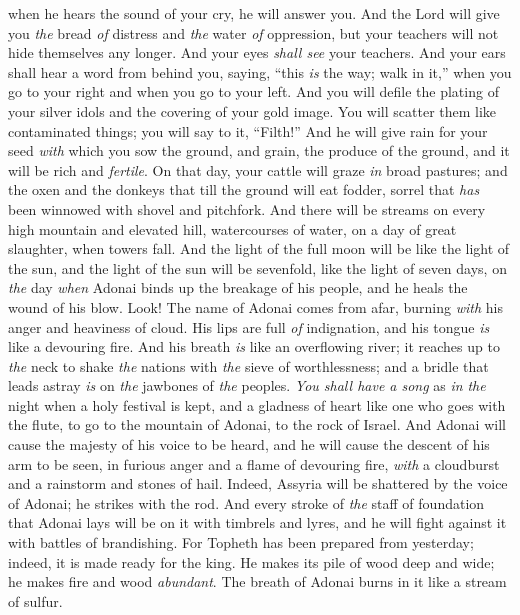 \begin{biblechapter}
when he hears the sound of your cry, he will answer you.
\verse And the Lord will give you \textit{the} bread \textit{of} distress 
and \textit{the} water \textit{of} oppression, 
but your teachers will not hide themselves any longer. 
And your eyes \textit{shall see} your teachers.
\verse And your ears shall hear a word from behind you, saying, 
“this \textit{is} the way; walk in it,” 
when you go to your right 
and when you go to your left.
\verse And you will defile the plating of your silver idols 
and the covering of your gold image. 
You will scatter them like contaminated things; 
you will say to it, “Filth!”
\verse And he will give rain for your seed \textit{with} which you sow the ground, 
and grain, the produce of the ground, and it will be rich and \textit{fertile}. 
On that day, your cattle will graze \textit{in} broad pastures;
\verse and the oxen and the donkeys that till the ground will eat fodder, sorrel 
that \textit{has} been winnowed with shovel and pitchfork.
\verse And there will be streams on every high mountain and elevated hill, 
watercourses of water, on a day of great slaughter, when towers fall.
\verse And the light of the full moon will be like the light of the sun, 
and the light of the sun will be sevenfold, like the light of seven days, 
on \textit{the} day \textit{when} Adonai binds up the breakage of his people, 
and he heals the wound of his blow.
 Look! The name of Adonai comes from afar, 
burning \textit{with} his anger and heaviness of cloud. 
His lips are full \textit{of} indignation, 
and his tongue \textit{is} like a devouring fire.
\verse And his breath \textit{is} like an overflowing river; 
it reaches up to \textit{the} neck 
to shake \textit{the} nations with \textit{the} sieve of worthlessness; 
and a bridle that leads astray \textit{is} on \textit{the} jawbones of \textit{the} peoples.
\verse \textit{You shall have a song} as \textit{in} \textit{the} night when a holy festival is kept, 
and a gladness of heart like one who goes with the flute, 
to go to the mountain of Adonai, to the rock of Israel.
\verse And Adonai will cause the majesty of his voice to be heard, 
and he will cause the descent of his arm to be seen, 
in furious anger and a flame of devouring fire, 
\textit{with} a cloudburst and a rainstorm and stones of hail.
\verse Indeed, Assyria will be shattered by the voice of Adonai; 
he strikes with the rod.
\verse And every stroke of \textit{the} staff of foundation that Adonai lays will be on it with timbrels and lyres, 
and he will fight against it with battles of brandishing.
\verse For Topheth has been prepared from yesterday; 
indeed, it is made ready for the king. 
He makes its pile of wood deep and wide; 
he makes fire and wood \textit{abundant}. 
The breath of Adonai burns in it like a stream of sulfur.
\end{biblechapter}

